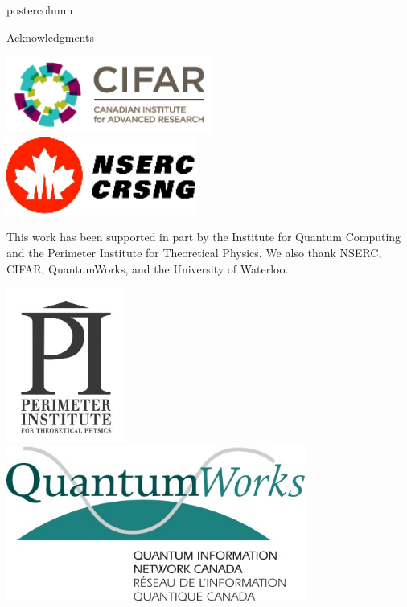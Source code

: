 \documentclass[final]{beamer} %
\begin{document}
\begin{frame}{}
\begin{columns}
\begin{column}{.33\textwidth}
\begin{beamercolorbox}[center,wd=\textwidth]{postercolumn}
\begin{minipage}[T]{.95\textwidth}
\begin{block}{\large Acknowledgments}
\begin{center}
                    \includegraphics[height=1in]{figures/CIFAR_Logo.png} \ \ \includegraphics[height=1in]{figures/NSERC_Logo.png}
                \end{center}
                This work has been supported in part by the Institute for Quantum Computing and the Perimeter Institute for Theoretical Physics. 
                We also thank NSERC, CIFAR, QuantumWorks, and the University of Waterloo.
                \begin{center}
                    \includegraphics[height=2in]{figures/PI_Logo.png} \ \ \includegraphics[height=2in]{figures/QuantumWorks_Logo.png}
                \end{center}
            \end{block}
        \end{minipage}
        \end{beamercolorbox}
        \end{column}
    \end{columns}
    \end{frame}
\end{document}
